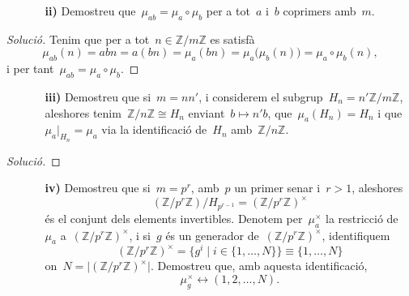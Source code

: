 \documentclass[a4paper]{article}
\newcommand{\ZZ}{\mathbb{Z}}
\newenvironment{solution}{
    \renewcommand\qedsymbol{\ensuremath{\lozenge}}
    \begin{proof}[Solució]
        }{
    \end{proof}
}
\begin{document}
\begin{enumerate}
    \item[] \begin{enumerate}
        \item[\textbf{ii)}] Demostreu que~\(\mu_{ab} = \mu_{a}\circ\mu_{b}\) per
            a tot~\(a\) i~\(b\) coprimers amb~\(m\).
    \end{enumerate}
\end{enumerate}

\begin{solution}
Tenim que per a tot~\(n\in\ZZ/m\ZZ\) es satisfà
\[
    \mu_{ab}(n)
    = abn
    = a(bn)
    = \mu_{a}(bn)
    = \mu_{a}\bigl(\mu_{b}(n)\bigr)
    = \mu_{a}\circ\mu_{b}(n),
\]
i per tant~\(\mu_{ab} = \mu_{a}\circ\mu_{b}\).
\end{solution}

\begin{enumerate}
    \item[] \begin{enumerate}
        \item[\textbf{iii)}] Demostreu que si~\(m=nn'\),
            i considerem el subgrup~\(H_{n}=n'\ZZ/m\ZZ\),
            aleshores tenim~\(\ZZ/n\ZZ \cong H_{n}\)
            enviant~\(b\mapsto n'b\),
            que~\(\mu_{a}(H_{n})=H_{n}\)
            i que~\(\mu_{a}\rvert_{H_{n}}=\mu_{a}\)
            via la identificació de~\(H_{n}\)
            amb~\(\ZZ/n\ZZ\).
    \end{enumerate}
\end{enumerate}

\begin{solution}
\end{solution}

\begin{enumerate}
    \item[] \begin{enumerate}
        \item[\textbf{iv)}] Demostreu que si~\(m=p^{r}\),
            amb~\(p\) un primer senar
            i~\(r>1\), aleshores
            \[
                (\ZZ/p^{r}\ZZ)/H_{p^{r-1}} = (\ZZ/p^{r}\ZZ)^{\times}
            \]
            és el conjunt dels elements invertibles.
            Denotem per~\(\mu_{a}^{\times}\)
            la restricció de~\(\mu_{a}\) a~\((\ZZ/p^{r}\ZZ)^{\times}\),
            i si~\(g\) és un generador de~\((\ZZ/p^{r}\ZZ)^{\times}\),
            identifiquem
            \[
                (\ZZ/p^{r}\ZZ)^{\times}
                =
                \{ g^{i} \mid i\in \{1,\dots,N\}\}
                \equiv
                \{1,\dots,N\}
            \]
            on~\(N = \lvert(\ZZ/p^{r}\ZZ)^{\times}\rvert\).
            Demostreu que, amb aquesta identificació,
            \[
                \mu_{g}^{\times} \leftrightarrow (1,2,\dots,N).
            \]
    \end{enumerate}
\end{enumerate}
\end{document}

